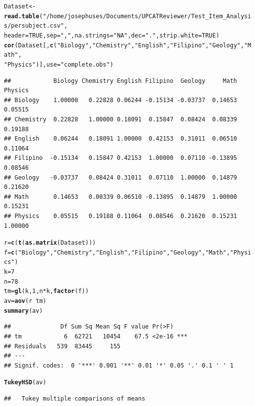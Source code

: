 \documentclass{article}\usepackage{graphicx, color}
\makeatletter
\newcommand{\hlfunctioncall}[1]{\textcolor[rgb]{0.501960784313725,0,0.329411764705882}{\textbf{#1}}}%
\newcommand{\hlstring}[1]{\textcolor[rgb]{0.6,0.6,1}{#1}}%
\newenvironment{kframe}{%
 \def\at@end@of@kframe{}%
 \ifinner\ifhmode%
  \def\at@end@of@kframe{\end{minipage}}%
  \begin{minipage}{\columnwidth}%
 \fi\fi%
 \def\FrameCommand##1{\hskip\@totalleftmargin \hskip-\fboxsep
 \colorbox{shadecolor}{##1}\hskip-\fboxsep
     \hskip-\linewidth \hskip-\@totalleftmargin \hskip\columnwidth}%
 \MakeFramed {\advance\hsize-\width
   \@totalleftmargin\z@ \linewidth\hsize
   \@setminipage}}%
 {\par\unskip\endMakeFramed%
 \at@end@of@kframe}
\newenvironment{knitrout}{}{} %
\makeatother
\begin{document}
\begin{knitrout}
\color{fgcolor}\begin{kframe}
\begin{alltt}

Dataset <- \hlfunctioncall{read.table}(\hlstring{"/home/josephuses/Documents/UPCATReviewer/Test_Item_Analysis/persubject.csv"}, 
    header = TRUE, sep = \hlstring{","}, na.strings = \hlstring{"NA"}, dec = \hlstring{"."}, strip.white = TRUE)
\hlfunctioncall{cor}(Dataset[, \hlfunctioncall{c}(\hlstring{"Biology"}, \hlstring{"Chemistry"}, \hlstring{"English"}, \hlstring{"Filipino"}, \hlstring{"Geology"}, \hlstring{"Math"}, 
    \hlstring{"Physics"})], use = \hlstring{"complete.obs"})
\end{alltt}
\begin{verbatim}
##            Biology Chemistry English Filipino  Geology     Math Physics
## Biology    1.00000   0.22828 0.06244 -0.15134 -0.03737  0.14653 0.05515
## Chemistry  0.22828   1.00000 0.18091  0.15847  0.08424  0.08339 0.19188
## English    0.06244   0.18091 1.00000  0.42153  0.31011  0.06510 0.11064
## Filipino  -0.15134   0.15847 0.42153  1.00000  0.07110 -0.13895 0.08546
## Geology   -0.03737   0.08424 0.31011  0.07110  1.00000  0.14879 0.21620
## Math       0.14653   0.08339 0.06510 -0.13895  0.14879  1.00000 0.15231
## Physics    0.05515   0.19188 0.11064  0.08546  0.21620  0.15231 1.00000
\end{verbatim}
\begin{alltt}
r = \hlfunctioncall{c}(\hlfunctioncall{t}(\hlfunctioncall{as.matrix}(Dataset)))
f = \hlfunctioncall{c}(\hlstring{"Biology"}, \hlstring{"Chemistry"}, \hlstring{"English"}, \hlstring{"Filipino"}, \hlstring{"Geology"}, \hlstring{"Math"}, \hlstring{"Physics"})
k = 7
n = 78
tm = \hlfunctioncall{gl}(k, 1, n * k, \hlfunctioncall{factor}(f))
av = \hlfunctioncall{aov}(r ~ tm)
\hlfunctioncall{summary}(av)
\end{alltt}
\begin{verbatim}
##              Df Sum Sq Mean Sq F value Pr(>F)    
## tm            6  62721   10454    67.5 <2e-16 ***
## Residuals   539  83445     155                   
## ---
## Signif. codes:  0 '***' 0.001 '**' 0.01 '*' 0.05 '.' 0.1 ' ' 1
\end{verbatim}
\begin{alltt}
\hlfunctioncall{TukeyHSD}(av)
\end{alltt}
\begin{verbatim}
##   Tukey multiple comparisons of means

\end{verbatim}
\end{kframe}
\end{knitrout}
\end{document}
